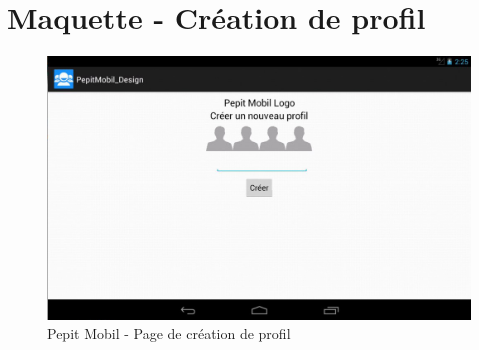 \section*{Maquette - Création de profil}
\begin{figure}[H]
\begin{center}
\includegraphics[width=15cm]{images/maquettes_creer_user}
\end{center}
\caption{Pepit Mobil - Page de création de profil}
\label{Pepit Mobil - Page de création de profil}
\end{figure}